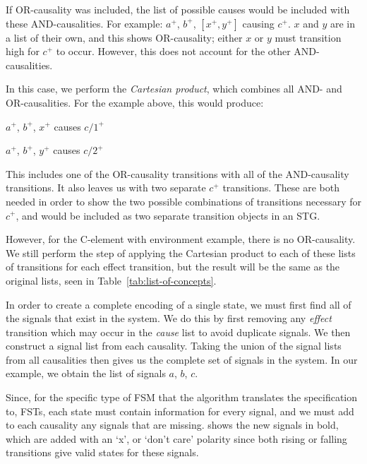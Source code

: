 If OR-causality was included, the list of possible causes would be included with these
AND-causalities. For example:  $a^{+}$, $b^{+}$, $[x^{+}, y^{+}]$ causing
$c^{+}$. $x$ and $y$ are in a list of their own, and this shows OR-causality;
either $x$ or $y$ must transition high for $c^{+}$ to occur. However, this does
not account for the other AND-causalities. 

In this case, we perform the \emph{Cartesian product}, which combines
all AND- and OR-causalities. For the example above, this would produce:

\vspace{-2mm}

\begin{center}

$a^{+}$, $b^{+}$, $x^{+}$ causes $c/1^{+}$

$a^{+}$, $b^{+}$, $y^{+}$ causes $c/2^{+}$

\end{center}

\vspace{-2mm}

\noindent This includes one of the OR-causality transitions with all of the 
AND-causality transitions. It also leaves us with two separate $c^{+}$ 
transitions. These are both needed in order to show the two possible 
combinations of transitions necessary for $c^{+}$, and would be included as two
separate transition objects in an STG. 

However, for the C-element with environment example, there is no OR-causality. 
We still perform the step of applying the Cartesian product to each of these 
lists of transitions for each effect transition, but the result will be the 
same as the original lists, seen in Table~\ref{tab:list-of-concepts}.

In order to create a complete encoding of a single state, we must first find all of the signals that exist in the system.
We do this by first removing any \emph{effect} transition which may occur in the \emph{cause} list to avoid duplicate signals.
We then construct a signal list from each causality.
Taking the union of the signal lists from all causalities then gives us the complete set of signals in the system.
In our example, we obtain the list of signals $a$, $b$, $c$.

Since, for the specific type of FSM that the algorithm translates the specification to, FSTs, each state must contain information for every signal, 
and we must add to each causality any signals that are missing.
 shows the new signals in bold, which are added with an `x', or `don't care' polarity since both rising or falling transitions give valid states for these signals.

